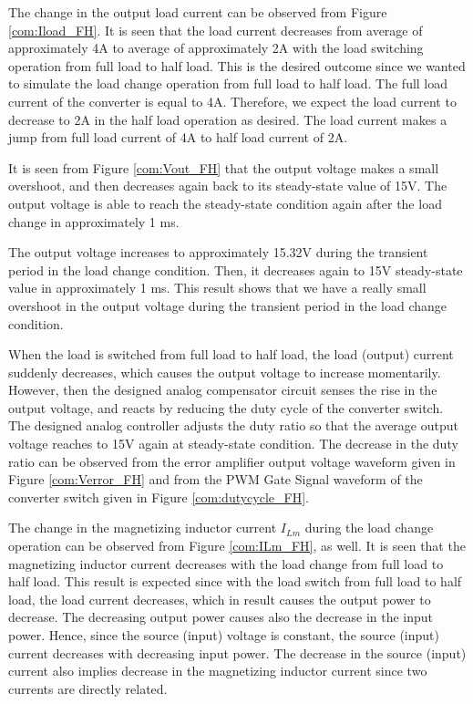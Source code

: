 The change in the output load current can be observed from Figure \ref{com:Iload_FH}. It is seen that the load current decreases from average of approximately 4A to average of approximately 2A with the load switching operation from full load to half load. This is the desired outcome since we wanted to simulate the load change operation from full load to half load. The full load current of the converter is equal to 4A. Therefore, we expect the load current to decrease to 2A in the half load operation as desired. The load current makes a jump from full load current of 4A to half load current of 2A.

It is seen from Figure \ref{com:Vout_FH} that the output voltage makes a small overshoot, and then decreases again back to its steady-state value of 15V. The output voltage is able to reach the steady-state condition again after the load change in approximately 1 ms.

The output voltage increases to approximately 15.32V during the transient period in the load change condition. Then, it decreases again to 15V steady-state value in approximately 1 ms. This result shows that we have a really small overshoot in the output voltage during the transient period in the load change condition.

When the load is switched from full load to half load, the load (output) current suddenly decreases, which causes the output voltage to increase momentarily. However, then the designed analog compensator circuit senses the rise in the output voltage, and reacts by reducing the duty cycle of the converter switch. The designed analog controller adjusts the duty ratio so that the average output voltage reaches to 15V again at steady-state condition. The decrease in the duty ratio can be observed from the error amplifier output voltage waveform given in Figure \ref{com:Verror_FH} and from the PWM Gate Signal waveform of the converter switch given in Figure \ref{com:dutycycle_FH}.

The change in the magnetizing inductor current $I_{Lm}$ during the load change operation can be observed from Figure \ref{com:ILm_FH}, as well. It is seen that the magnetizing inductor current decreases with the load change from full load to half load. This result is expected since with the load switch from full load to half load, the load current decreases, which in result causes the output power to decrease. The decreasing output power causes also the decrease in the input power. Hence, since the source (input) voltage is constant, the source (input) current decreases with decreasing input power. The decrease in the source (input) current also implies decrease in the magnetizing inductor current since two currents are directly related.

